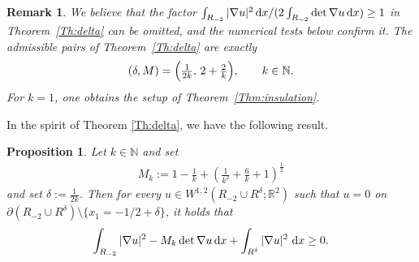 \documentclass[12pt]{amsart}
\newcommand{\md}{{\rm d}}
\newcommand{\dx}{\, \md x}
\newcommand{\R}{\mathbb{R}}
\newcommand{\N}{\mathbb{N}}
\newcommand{\1}{{\bf 1}}
\newtheorem{proposition}[definition]{Proposition}
\newtheorem{remark}[definition]{Remark}
\begin{document}
\begin{remark}\label{expansion_delta}
We believe that the factor $\int_{R_{-2}}|\nabla u|^2 \,\md x /(2\int_{R_{-2}}\det\nabla u\,\md x)\ge 1$ in Theorem~\ref{Th:delta} can be omitted, and the numerical tests below confirm it.  The admissible pairs of Theorem~\ref{Th:delta} are exactly
\[
(\delta, M)=\Bigl(\tfrac{1}{2k},\,2+\tfrac{2}{k}\Bigr), \qquad k\in\mathbb{N}.
\]
For $k=1$, one obtains the setup of Theorem~\ref{Thm:insulation}. 
\end{remark}
In the spirit of Theorem \ref{Th:delta}, we have the following result.  
\begin{proposition}\label{asymptotic}
Let $k \in \N$ and set
\begin{align}\label{mk}M_k:=1-\frac{1}{k}+\left(\frac{1}{k^2}+\frac{6}{k}+1\right)^{\frac{1}{2}}\end{align}
and set $\delta:=\frac{1}{2k}$.  Then for every $u\in W^{1,2}(R_{-2}\cup R^\delta;\R^2)$ such that $u=0$ on $\partial ( R_{-2}\cup R^\delta)\setminus \{x_1=-1/2+\delta\}$, it holds that 
\begin{align}\label{marmite}
\int_{R_{-2}}|\nabla u|^2 - M_k \det \nabla u \dx + \int_{R^{\delta}}|\nabla u|^2 \,\dx \geq 0.
\end{align}
\end{proposition}
\end{document}
